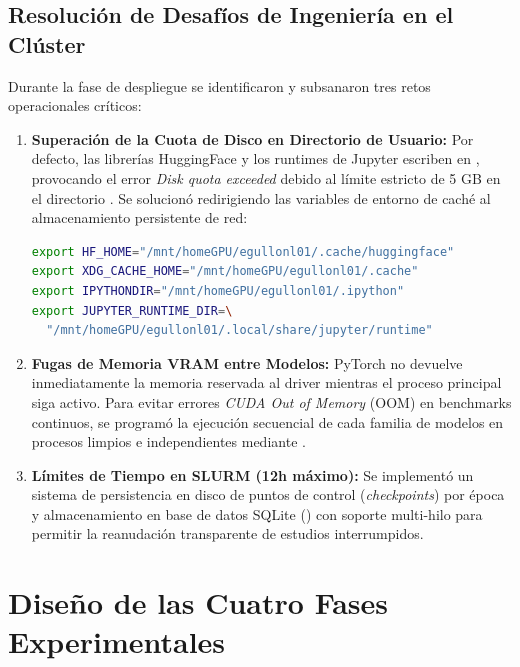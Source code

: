 \subsection{Resolución de Desafíos de Ingeniería en el Clúster}
Durante la fase de despliegue se identificaron y subsanaron tres retos operacionales críticos:
\begin{enumerate}
    \item \textbf{Superación de la Cuota de Disco en Directorio de Usuario:} Por defecto, las librerías HuggingFace y los runtimes de Jupyter escriben en , provocando el error \textit{Disk quota exceeded} debido al límite estricto de 5 GB en el directorio . Se solucionó redirigiendo las variables de entorno de caché al almacenamiento persistente de red:
\begin{lstlisting}[language=bash,breaklines=true,basicstyle=\footnotesize\ttfamily]
export HF_HOME="/mnt/homeGPU/egullonl01/.cache/huggingface"
export XDG_CACHE_HOME="/mnt/homeGPU/egullonl01/.cache"
export IPYTHONDIR="/mnt/homeGPU/egullonl01/.ipython"
export JUPYTER_RUNTIME_DIR=\
  "/mnt/homeGPU/egullonl01/.local/share/jupyter/runtime"
\end{lstlisting}
    \item \textbf{Fugas de Memoria VRAM entre Modelos:} PyTorch no devuelve inmediatamente la memoria reservada al driver mientras el proceso principal siga activo. Para evitar errores \textit{CUDA Out of Memory} (OOM) en benchmarks continuos, se programó la ejecución secuencial de cada familia de modelos en procesos limpios e independientes mediante .
    \item \textbf{Límites de Tiempo en SLURM (12h máximo):} Se implementó un sistema de persistencia en disco de puntos de control (\textit{checkpoints}) por época y almacenamiento en base de datos SQLite (\code{optuna\_v2.db}) con soporte multi-hilo para permitir la reanudación transparente de estudios interrumpidos.
\end{enumerate}


\section{Diseño de las Cuatro Fases Experimentales}
\label{sec:exp_fases}


